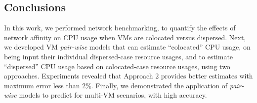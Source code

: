 \vspace{-0.2in}
\subsection{Conclusions}
In this work, we performed network benchmarking, to 
quantify the effects of network affinity on CPU usage when VMs
are colocated versus dispersed. 
Next, we developed VM \textit{pair-wise} models
that can estimate ``colocated'' CPU usage, on being
input their individual dispersed-case resource usages,
and to estimate ``dispersed'' CPU
usage based on colocated-case resource usages, using two approaches.
Experiments revealed that Approach 2 provides better estimates
with maximum error less than 2\%.
Finally, we demonstrated the
application of \textit{pair-wise} models to predict for multi-VM
scenarios, with high accuracy.
